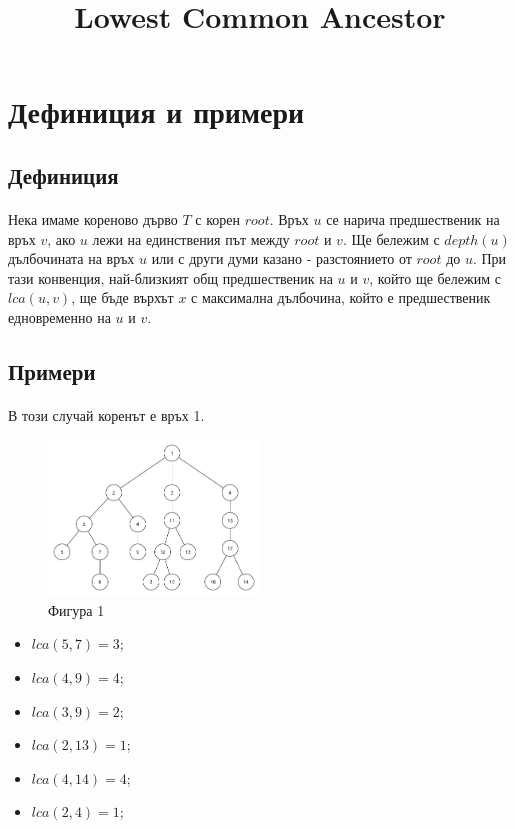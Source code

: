 \documentclass[12pt]{article}
\begin{document}
\title{Lowest Common Ancestor}
\date{}
\maketitle

\section*{Дефиниция и примери}
\subsection*{Дефиниция}
\paragraph*{}
Нека имаме кореново дърво $T$ с корен $root$. Връх $u$ се нарича предшественик на връх $v$, ако $u$ лежи на единствения път между $root$ и $v$. Ще бележим с $depth(u)$ дълбочината на връх $u$ или с други думи казано - разстоянието от $root$ до $u$. При тази конвенция, най-близкият общ предшественик на $u$ и $v$, който ще бележим с $lca(u, v)$, ще бъде върхът $x$ с максимална дълбочина, който е предшественик едновременно на $u$ и $v$. 
\subsection*{Примери}
\paragraph*{}
В този случай коренът е връх 1.

\begin{figure}[h]
\caption*{Фигура 1}
\centering
\includegraphics[width=0.5\textwidth]{tree1}
\end{figure}

\raggedright
\begin{itemize}
	\item $lca(5, 7) = 3$;
	\item $lca(4, 9) = 4$;
	\item $lca(3, 9) = 2$;
	\item $lca(2, 13) = 1$;
	\item $lca(4, 14) = 4$;
	\item $lca(2, 4) = 1$;
\end{itemize}
\end{document}
